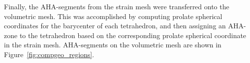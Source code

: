 Finally, the AHA-segments from the strain mesh were transferred onto the volumetric mesh.
This was accomplished by computing prolate spherical coordinates for
the barycenter of each tetrahedron,
and then assigning an AHA-zone to the tetrahedron 
based on the corresponding prolate spherical coordinate in the strain mesh. 
AHA-segments on the volumetric mesh are shown in Figure~\ref{fig:compgeo_regions}.

\begin{figure}[htbp]
\centering
\begin{subfigure}[t]{0.25\textwidth}
     \centering
     \caption{\label{fig:ultrasound_image}}
\end{subfigure}
\qquad
\begin{subfigure}[t]{0.25\textwidth}

\end{subfigure}
\end{figure}
